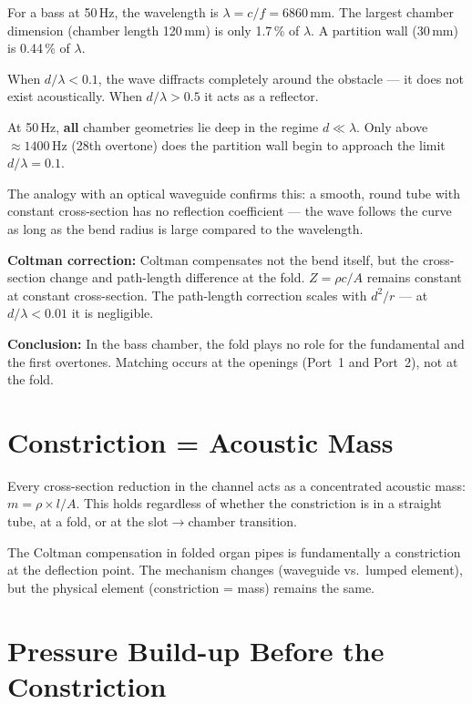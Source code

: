 \documentclass[11pt,a4paper]{article}
\begin{document}
For a bass at 50\,Hz, the wavelength is $\lambda = c/f = 6860$\,mm. The largest chamber dimension (chamber length 120\,mm) is only 1.7\,\% of $\lambda$. A partition wall (30\,mm) is 0.44\,\% of $\lambda$.

When $d/\lambda < 0{.}1$, the wave diffracts completely around the obstacle --- it does not exist acoustically. When $d/\lambda > 0{.}5$ it acts as a reflector.

At 50\,Hz, \textbf{all} chamber geometries lie deep in the regime $d \ll \lambda$. Only above $\approx 1400$\,Hz (28th overtone) does the partition wall begin to approach the limit $d/\lambda = 0{.}1$.

The analogy with an optical waveguide confirms this: a smooth, round tube with constant cross-section has no reflection coefficient --- the wave follows the curve as long as the bend radius is large compared to the wavelength.

\textbf{Coltman correction:} Coltman compensates not the bend itself, but the cross-section change and path-length difference at the fold. $Z = \rho c / A$ remains constant at constant cross-section. The path-length correction scales with $d^2/r$ --- at $d/\lambda < 0{.}01$ it is negligible.

\begin{tcolorbox}[colframe=keygreen, colback=green!5!white]
\textbf{Conclusion:} In the bass chamber, the fold plays no role for the fundamental and the first overtones. Matching occurs at the openings (Port~1 and Port~2), not at the fold.
\end{tcolorbox}

\section{Constriction = Acoustic Mass}

Every cross-section reduction in the channel acts as a concentrated acoustic mass: $m = \rho \times l / A$. This holds regardless of whether the constriction is in a straight tube, at a fold, or at the slot$\to$chamber transition.

The Coltman compensation in folded organ pipes is fundamentally a constriction at the deflection point. The mechanism changes (waveguide vs.\ lumped element), but the physical element (constriction = mass) remains the same.

\section{Pressure Build-up Before the Constriction}
\end{document}
